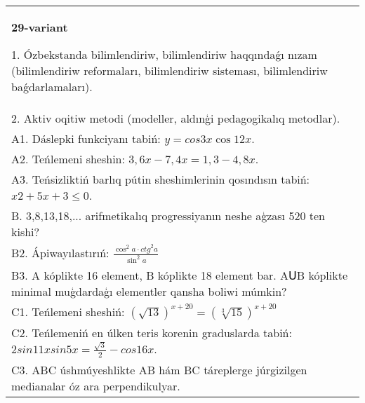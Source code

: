 \documentclass{article}
\begin{document}
\begin{tabular}{m{17cm}}
\textbf{29-variant}

1. Ózbekstanda bilimlendiriw, bilimlendiriw haqqındaǵı nızam (bilimlendiriw reformaları, bilimlendiriw sisteması, bilimlendiriw baǵdarlamaları). \\
2. Aktiv oqitiw metodi (modeller, aldınģi pedagogikalıq metodlar). \\
A1. Dáslepki funkciyanı tabiń: \(y=cos{3x}\cos{12x}\). \\
A2. Teńlemeni sheshin: \(3,6x - 7,4x = 1,3 - 4,8x\). \\
A3. Teńsizliktiń barlıq pútin sheshimlerinin qosındısın tabiń: \(x2 + 5x + 3 \leq 0\). \\
B. 3,8,13,18,... arifmetikalıq progressiyanın neshe aģzası 520 ten kishi? \\
B2. Ápiwayılastırıń: \(\frac{\cos^{2}a \cdot {ctg}^{2}a}{\sin^{2}a}\) \\
B3. A kóplikte 16 element, B kóplikte 18 element bar. AՍB kóplikte minimal muģdardaģı elementler qansha boliwi múmkin? \\
C1. Teńlemeni sheshiń: \((\sqrt{13}) ^{x + 20} = (\sqrt[3]{15}) ^{x + 20}\) \\
C2. Teńlemeniń en úlken teris korenin graduslarda tabiń: \(2sin11xsin5x = \frac{\sqrt{3}}{2} - cos16x\). \\
C3. ABC úshmúyeshlikte AB hám BC táreplerge júrgizilgen medianalar óz ara perpendikulyar. \\

\end{tabular}
\vspace{1cm}
\end{document}

